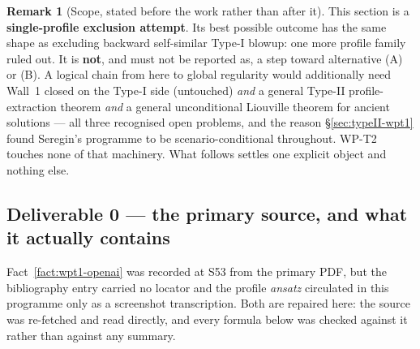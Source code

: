 \documentclass[11pt]{article}
\theoremstyle{definition}
\newtheorem{remark}[theorem]{Remark}
\theoremstyle{remark}
\begin{document}
\begin{remark}[Scope, stated before the work rather than after it]
  \label{rem:wpt2-scope-up-front}
  This section is a \textbf{single-profile exclusion attempt}. Its best
  possible outcome has the same shape as
  \cite{NecasRuzickaSverak1996} excluding backward self-similar Type-I
  blowup: one more profile family ruled out. It is \textbf{not}, and must not
  be reported as, a step toward alternative (A) or (B). A logical chain from
  here to global regularity would additionally need Wall~1 closed on the
  Type-I side (untouched) \emph{and} a general Type-II profile-extraction
  theorem \emph{and} a general unconditional Liouville theorem for ancient
  solutions --- all three recognised open problems, and the reason
  \S\ref{sec:typeII-wpt1} found Seregin's programme to be
  scenario-conditional throughout. WP-T2 touches none of that machinery.
  What follows settles one explicit object and nothing else.
\end{remark}

\subsection{Deliverable 0 --- the primary source, and what it actually
contains}
\label{subsec:wpt2-source}

Fact~\ref{fact:wpt1-openai} was recorded at S53 from the primary PDF, but the
bibliography entry carried no locator and the profile \emph{ansatz} circulated
in this programme only as a screenshot transcription. Both are repaired here:
the source was re-fetched and read directly, and every formula below was
checked against it rather than against any summary.
\end{document}
